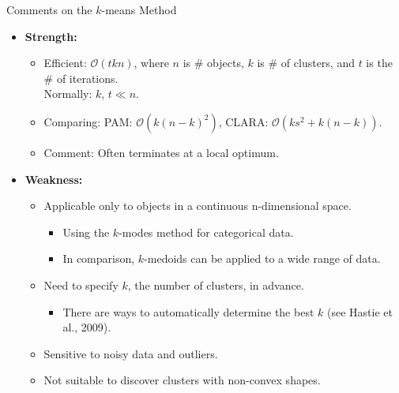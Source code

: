 \begin{frame}{Comments on the $k$-means Method}
	\begin{itemize}
		\item \textbf{Strength:}
		      \begin{itemize}
			      \item Efficient: $\mathcal{O}(tkn)$, where $n$ is $\#$ objects, $k$
			            is $\#$ of clusters, and $t$ is the $\#$ of iterations. \\
			            Normally: $k$, $t \ll n$.
			      \item Comparing: PAM: $\mathcal{O}(k(n-k)^2)$, CLARA:
			            $\mathcal{O}(ks^2 + k(n-k))$.
			      \item Comment: Often terminates at a local optimum.
		      \end{itemize}
		\item \textbf{Weakness:}
		      \begin{itemize}
			      \item Applicable only to objects in a continuous n-dimensional
			            space.
			            \begin{itemize}
				            \item Using the $k$-modes method for categorical data.
				            \item In comparison, $k$-medoids can be applied to a wide range
				                  of data.
			            \end{itemize}
			      \item Need to specify $k$, the number of clusters, in advance.
			            \begin{itemize}
				            \item There are ways to automatically determine the best $k$
				                  (see Hastie et al., 2009).
			            \end{itemize}
			      \item Sensitive to noisy data and outliers.
			      \item Not suitable to discover clusters with non-convex shapes.
		      \end{itemize}
	\end{itemize}
\end{frame}

